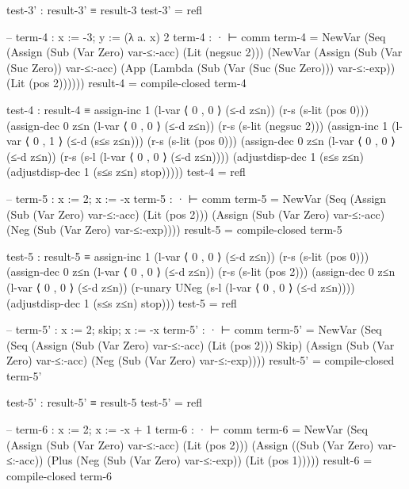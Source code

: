 \documentclass{article}
\begin{document}
\begin{prev}
\begin{code}
test-3' : result-3' ≡ result-3
test-3' = refl


-- term-4 : x := -3; y := (λ a. x) 2
term-4 : · ⊢ comm
term-4 = 
    NewVar 
        (Seq 
            (Assign 
                (Sub (Var Zero) var-≤:-acc) 
                (Lit (negsuc 2)))
            (NewVar 
                (Assign 
                    (Sub (Var (Suc Zero)) var-≤:-acc)
                    (App 
                        (Lambda (Sub (Var (Suc (Suc Zero))) var-≤:-exp))
                        (Lit (pos 2))))))
result-4 = compile-closed term-4

test-4 : result-4 ≡
    assign-inc 1 
    (l-var ⟨ 0 , 0 ⟩ (≤-d z≤n)) 
    (r-s (s-lit (pos 0)))
    (assign-dec 0 z≤n 
        (l-var ⟨ 0 , 0 ⟩ (≤-d z≤n))
        (r-s (s-lit (negsuc 2)))
        (assign-inc 1 
            (l-var ⟨ 0 , 1 ⟩ (≤-d (s≤s z≤n)))
            (r-s (s-lit (pos 0)))
            (assign-dec 0 z≤n 
                (l-var ⟨ 0 , 0 ⟩ (≤-d z≤n))
                (r-s (s-l (l-var ⟨ 0 , 0 ⟩ (≤-d z≤n))))
                (adjustdisp-dec 1 (s≤s z≤n)
                    (adjustdisp-dec 1 (s≤s z≤n) stop)))))
test-4 = refl


-- term-5 : x := 2; x := -x
term-5 : · ⊢ comm
term-5 = 
    NewVar 
        (Seq 
            (Assign 
                (Sub (Var Zero) var-≤:-acc) 
                (Lit (pos 2))) 
            (Assign 
                (Sub (Var Zero) var-≤:-acc)
                (Neg (Sub (Var Zero) var-≤:-exp))))
result-5 = compile-closed term-5

test-5 : result-5 ≡ 
    assign-inc 1 
    (l-var ⟨ 0 , 0 ⟩ (≤-d z≤n)) 
    (r-s (s-lit (pos 0)))
    (assign-dec 0 z≤n 
        (l-var ⟨ 0 , 0 ⟩ (≤-d z≤n)) 
        (r-s (s-lit (pos 2)))
        (assign-dec 0 z≤n 
            (l-var ⟨ 0 , 0 ⟩ (≤-d z≤n))
            (r-unary UNeg (s-l (l-var ⟨ 0 , 0 ⟩ (≤-d z≤n)))) 
            (adjustdisp-dec 1 (s≤s z≤n) stop)))
test-5 = refl

-- term-5' : x := 2; skip; x := -x
term-5' : · ⊢ comm
term-5' = 
    NewVar 
        (Seq 
            (Seq 
                (Assign 
                    (Sub (Var Zero) var-≤:-acc) 
                    (Lit (pos 2))) 
                Skip)
            (Assign 
                (Sub (Var Zero) var-≤:-acc)
                (Neg (Sub (Var Zero) var-≤:-exp))))
result-5' = compile-closed term-5'

test-5' : result-5' ≡ result-5
test-5' = refl


-- term-6 : x := 2; x := -x + 1
term-6 : · ⊢ comm
term-6 = 
    NewVar 
        (Seq 
            (Assign 
                (Sub (Var Zero) var-≤:-acc) 
                (Lit (pos 2)))
            (Assign 
                ((Sub (Var Zero) var-≤:-acc)) 
                (Plus 
                    (Neg (Sub (Var Zero) var-≤:-exp)) 
                    (Lit (pos 1)))))
result-6 = compile-closed term-6


\end{code}
\end{prev}
\end{document}
